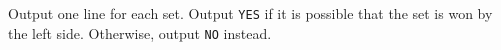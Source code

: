Output one line for each set.
Output \verb|YES| if it is possible that the set is won by the left side.
Otherwise, output \verb|NO| instead.
